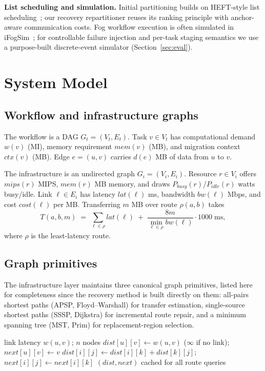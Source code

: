 \documentclass[conference]{IEEEtran}
\theoremstyle{remark}
\begin{document}
\textbf{List scheduling and simulation.}
Initial partitioning builds on HEFT-style list
scheduling~\cite{topcuoglu2002heft}; our recovery repartitioner reuses its
ranking principle with anchor-aware communication costs. Fog workflow
execution is often simulated in iFogSim~\cite{ifogsim}; for controllable
failure injection and per-task staging semantics we use a purpose-built
discrete-event simulator (Section~\ref{sec:eval}).

\section{System Model}

\subsection{Workflow and infrastructure graphs}

The workflow is a DAG $G_t = (V_t, E_t)$. Task $v \in V_t$ has computational
demand $w(v)$ (MI), memory requirement $\mathit{mem}(v)$ (MB), and migration
context $\mathit{ctx}(v)$ (MB). Edge $e=(u,v)$ carries $d(e)$ MB of data from
$u$ to $v$.

The infrastructure is an undirected graph $G_i = (V_i, E_i)$. Resource
$r \in V_i$ offers $\mathit{mips}(r)$ MIPS, $\mathit{mem}(r)$ MB memory, and
draws $P_{busy}(r)$/$P_{idle}(r)$ watts busy/idle. Link $\ell \in E_i$ has
latency $\mathit{lat}(\ell)$ ms, bandwidth $\mathit{bw}(\ell)$ Mbps, and cost
$\mathit{cost}(\ell)$ per MB. Transferring $m$ MB over route $\rho(a,b)$
takes
\[
T(a,b,m) \;=\; \sum_{\ell \in \rho} \mathit{lat}(\ell) \;+\;
\frac{8m}{\min_{\ell \in \rho} \mathit{bw}(\ell)}\cdot 1000 \;\text{ms},
\]
where $\rho$ is the least-latency route.

\subsection{Graph primitives}

The infrastructure layer maintains three canonical graph primitives, listed
here for completeness since the recovery method is built directly on them:
all-pairs shortest paths (APSP, Floyd--Warshall) for transfer estimation,
single-source shortest paths (SSSP, Dijkstra) for incremental route repair,
and a minimum spanning tree (MST, Prim) for replacement-region selection.

\begin{algorithm}
\caption{APSP -- Floyd--Warshall (once at init)}
\label{alg:apsp}
\begin{algorithmic}[1]
\REQUIRE link latency $w(u,v)$; $n$ nodes
\STATE $\mathit{dist}[u][v] \gets w(u,v)$ ($\infty$ if no link);\quad
       $\mathit{next}[u][v] \gets v$
      \STATE $\mathit{dist}[i][j] \gets \mathit{dist}[i][k] +
             \mathit{dist}[k][j]$;\quad
             $\mathit{next}[i][j] \gets \mathit{next}[i][k]$
    \ENDIF
  \ENDFOR
\ENDFOR
\RETURN $(\mathit{dist}, \mathit{next})$ cached for all route queries
\end{algorithmic}
\end{algorithm}
\end{document}
